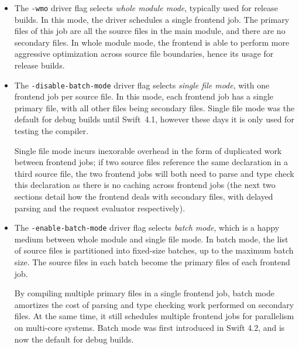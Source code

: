\documentclass[../generics]{subfiles}
\begin{document}
\begin{itemize}
\item The \texttt{-wmo} driver flag selects \emph{whole module mode}, typically used for release builds. In this mode, the driver schedules a single frontend job. The primary files of this job are all the source files in the main module, and there are no secondary files. In whole module mode, the frontend is able to perform more aggressive optimization across source file boundaries, hence its usage for release builds.
\item The \texttt{-disable-batch-mode} driver flag selects \emph{single file mode}, with one frontend job per source file. In this mode, each frontend job has a single primary file, with all other files being secondary files. Single file mode was the default for debug builds until Swift~4.1, however these days it is only used for testing the compiler.

Single file mode incurs inexorable overhead in the form of duplicated work between frontend jobs; if two source files reference the same declaration in a third source file, the two frontend jobs will both need to parse and type check this declaration as there is no caching across frontend jobs (the next two sections detail how the frontend deals with secondary files, with delayed parsing and the request evaluator respectively).

\item The \texttt{-enable-batch-mode} driver flag selects \emph{batch mode}, which is a happy medium between whole module and single file mode. In batch mode, the list of source files is partitioned into fixed-size batches, up to the maximum batch size. The source files in each batch become the primary files of each frontend job.

By compiling multiple primary files in a single frontend job, batch mode amortizes the cost of parsing and type checking work performed on secondary files. At the same time, it still schedules multiple frontend jobs for parallelism on multi-core systems. Batch mode was first introduced in Swift 4.2, and is now the default for debug builds.
\end{itemize}
\end{document}
